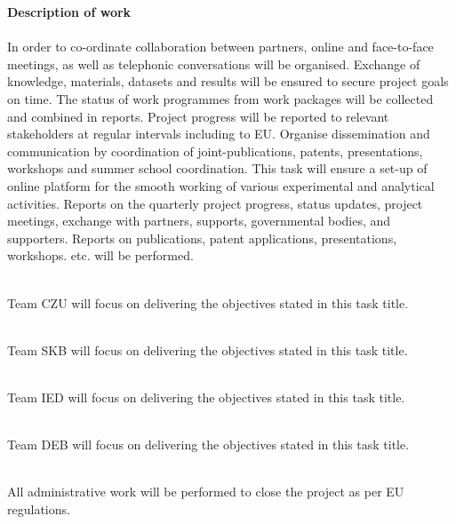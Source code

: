 \textbf{Description of work}\\
\\
In order to co-ordinate collaboration between partners, online and face-to-face meetings, as well as telephonic conversations will be organised. Exchange of knowledge, materials, datasets and results will be ensured to secure project goals on time. The status of work programmes from work packages will be collected and combined in reports. Project progress will be reported to relevant stakeholders at regular intervals including to EU. Organise dissemination and communication by coordination of joint-publications, patents, presentations, workshops and summer school coordination. This task will ensure a set-up of online platform for the smooth working of various experimental and analytical activities. Reports on the quarterly project progress, status updates, project meetings, exchange with partners, supports, governmental bodies, and supporters. Reports on publications, patent applications, presentations, workshops. etc. will be performed.

\\
Team CZU will focus on delivering the objectives stated in this task title.

\\
Team SKB will focus on delivering the objectives stated in this task title.

\\
Team IED will focus on delivering the objectives stated in this task title.

\\
Team DEB will focus on delivering the objectives stated in this task title.

\\
All administrative work will be performed to close the project as per EU regulations.


